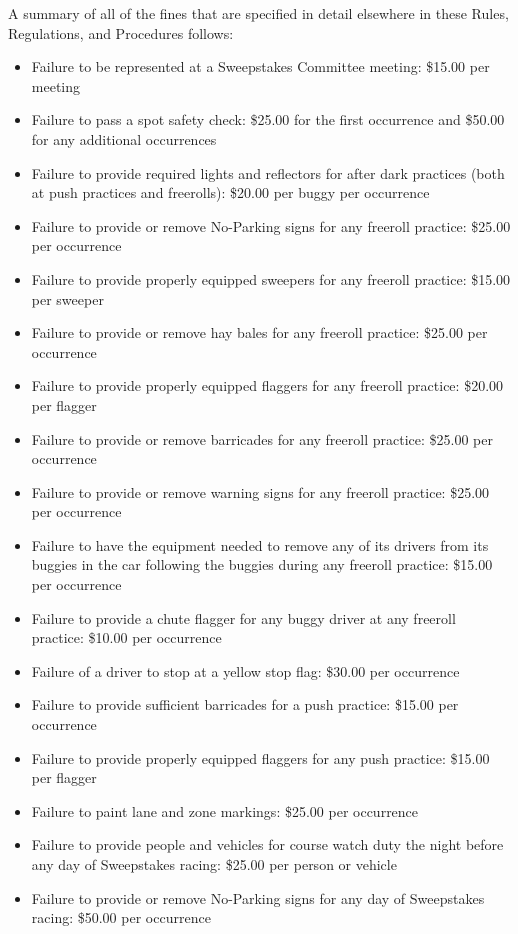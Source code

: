 A summary of all of the fines that are specified in detail elsewhere in these Rules, Regulations, and Procedures follows:
\begin{itemize}
	\item Failure to be represented at a Sweepstakes Committee meeting: \$15.00 per meeting
	\item Failure to pass a spot safety check: \$25.00 for the first occurrence and \$50.00 for any additional occurrences
	\item Failure to provide required lights and reflectors for after dark practices (both at push practices and freerolls): \$20.00 per buggy per occurrence
	\item Failure to provide or remove No-Parking signs for any freeroll practice: \$25.00 per occurrence
	\item Failure to provide properly equipped sweepers for any freeroll practice: \$15.00 per sweeper
	\item Failure to provide or remove hay bales for any freeroll practice: \$25.00 per occurrence
	\item Failure to provide properly equipped flaggers for any freeroll practice: \$20.00 per flagger
	\item Failure to provide or remove barricades for any freeroll practice: \$25.00 per occurrence
	\item Failure to provide or remove warning signs for any freeroll practice: \$25.00 per occurrence
	\item Failure to have the equipment needed to remove any of its drivers from its buggies in the car following the buggies during any freeroll practice: \$15.00 per occurrence
	\item Failure to provide a chute flagger for any buggy driver at any freeroll practice: \$10.00 per occurrence
	\item Failure of a driver to stop at a yellow stop flag: \$30.00 per occurrence
	\item Failure to provide sufficient barricades for a push practice: \$15.00 per occurrence
	\item Failure to provide properly equipped flaggers for any push practice: \$15.00 per flagger
	\item Failure to paint lane and zone markings: \$25.00 per occurrence
	\item Failure to provide people and vehicles for course watch duty the night before any day of Sweepstakes racing: \$25.00 per person or vehicle
	\item Failure to provide or remove No-Parking signs for any day of Sweepstakes racing: \$50.00 per occurrence

\end{itemize}
